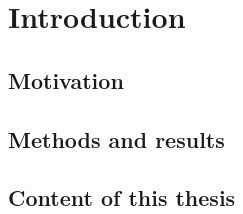 \chapter{Introduction}

\section{Motivation}
\section{Methods and results}
\section{Content of this thesis}
\clearpage{\pagestyle{empty}\cleardoublepage}
